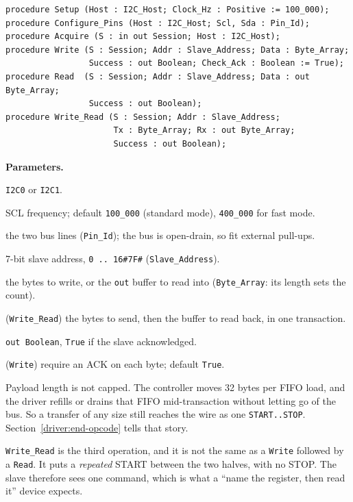 \begin{lstlisting}
procedure Setup (Host : I2C_Host; Clock_Hz : Positive := 100_000);
procedure Configure_Pins (Host : I2C_Host; Scl, Sda : Pin_Id);
procedure Acquire (S : in out Session; Host : I2C_Host);
procedure Write (S : Session; Addr : Slave_Address; Data : Byte_Array;
                 Success : out Boolean; Check_Ack : Boolean := True);
procedure Read  (S : Session; Addr : Slave_Address; Data : out Byte_Array;
                 Success : out Boolean);
procedure Write_Read (S : Session; Addr : Slave_Address;
                      Tx : Byte_Array; Rx : out Byte_Array;
                      Success : out Boolean);
\end{lstlisting}

\textbf{Parameters.}
\begin{description}[style=nextline]
\item[\texttt{Host}] \texttt{I2C0} or \texttt{I2C1}.
\item[\texttt{Clock\_Hz}] SCL frequency; default \texttt{100\_000} (standard mode),
  \texttt{400\_000} for fast mode.
\item[\texttt{Scl}, \texttt{Sda}] the two bus lines (\texttt{Pin\_Id}); the bus is
  open-drain, so fit external pull-ups.
\item[\texttt{Addr}] 7-bit slave address, \texttt{0\,..\,16\#7F\#}
  (\texttt{Slave\_Address}).
\item[\texttt{Data}] the bytes to write, or the \texttt{out} buffer to read into
  (\texttt{Byte\_Array}: its length sets the count).
\item[\texttt{Tx}, \texttt{Rx}] (\texttt{Write\_Read}) the bytes to send, then the
  buffer to read back, in one transaction.
\item[\texttt{Success}] \texttt{out Boolean}, \texttt{True} if the slave
  acknowledged.
\item[\texttt{Check\_Ack}] (\texttt{Write}) require an ACK on each byte; default
  \texttt{True}.
\end{description}

Payload length is not capped. The controller moves 32 bytes per FIFO load, and the
driver refills or drains that FIFO mid-transaction without letting go of the bus.
So a transfer of any size still reaches the wire as one \texttt{START..STOP}.
Section~\ref{driver:end-opcode} tells that story.

\texttt{Write\_Read} is the third operation, and it is not the same as a
\texttt{Write} followed by a \texttt{Read}. It puts a \emph{repeated} START
between the two halves, with no STOP. The slave therefore sees one command, which
is what a ``name the register, then read it'' device expects.

